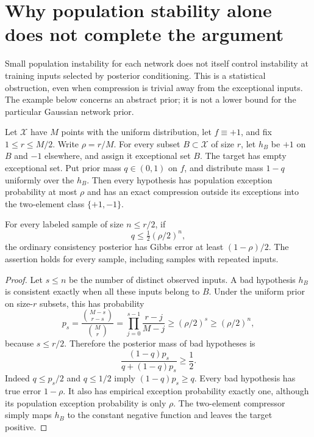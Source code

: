 \section{Why population stability alone does not complete the argument}
\label{sec:distributional-only-obstruction}

Small population instability for each network does not itself control
instability at training inputs selected by posterior conditioning. This
is a statistical obstruction, even when compression is trivial away from
the exceptional inputs. The example below concerns an abstract prior;
it is not a lower bound for the particular Gaussian network prior.

\begin{proposition}
\label{prop:distributional-sparse-patches}
Let $\mathcal X$ have $M$ points with the uniform distribution, let
$f\equiv+1$, and fix $1\le r\le M/2$. Write $\rho=r/M$.
For every subset $B\subset\mathcal X$ of size $r$, let $h_B$ be $+1$
on $B$ and $-1$ elsewhere, and assign it exceptional set $B$.
The target has empty exceptional set. Put prior mass $q\in(0,1)$ on
$f$, and distribute mass $1-q$ uniformly over the $h_B$.
Then every hypothesis has population exception probability at most
$\rho$ and has an exact compression outside its exceptions into the
two-element class $\{+1,-1\}$.

For every labeled sample of size $n\le r/2$, if
\[
 q\le\tfrac12(\rho/2)^n,
\]
the ordinary consistency posterior has Gibbs error at least
$(1-\rho)/2$. The assertion holds for every sample, including samples
with repeated inputs.
\end{proposition}

\begin{proof}
Let $s\le n$ be the number of distinct observed inputs. A bad hypothesis
$h_B$ is consistent exactly when all these inputs belong to $B$.
Under the uniform prior on size-$r$ subsets, this has probability
\[
 p_s=\frac{\binom{M-s}{r-s}}{\binom Mr}
     =\prod_{j=0}^{s-1}\frac{r-j}{M-j}
     \ge(\rho/2)^s\ge(\rho/2)^n,
\]
because $s\le r/2$. Therefore the posterior mass of bad hypotheses is
\[
 \frac{(1-q)p_s}{q+(1-q)p_s}\ge\frac12.
\]
Indeed $q\le p_s/2$ and $q\le1/2$ imply $(1-q)p_s\ge q$.
Every bad hypothesis has true error $1-\rho$. It also has empirical
exception probability exactly one, although its population exception
probability is only $\rho$. The two-element compressor simply maps
$h_B$ to the constant negative function and leaves the target positive.
\end{proof}

